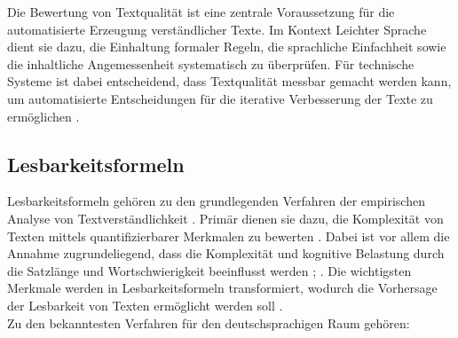 
Die Bewertung von Textqualität ist eine zentrale Voraussetzung für die automatisierte Erzeugung verständlicher Texte. 
Im Kontext Leichter Sprache dient sie dazu, die Einhaltung formaler Regeln, die sprachliche Einfachheit sowie die inhaltliche Angemessenheit systematisch zu überprüfen.
Für technische Systeme ist dabei entscheidend, dass Textqualität messbar gemacht werden kann, um automatisierte Entscheidungen für die iterative Verbesserung der Texte zu ermöglichen \cite[S. 85-90]{maas_handbuch_2018}.

\subsection{Lesbarkeitsformeln}
Lesbarkeitsformeln gehören zu den grundlegenden Verfahren der empirischen Analyse von Textverständlichkeit \cite[S. 123-124]{maas_handbuch_2018}.
Primär dienen sie dazu, die Komplexität von Texten mittels quantifizierbarer Merkmalen zu bewerten \cite[S. 123-124]{maas_handbuch_2018}.
Dabei ist vor allem die Annahme zugrundeliegend, dass die Komplexität und kognitive Belastung durch die Satzlänge und Wortschwierigkeit beeinflusst werden \cite[S. 149-150]{alva-manchego_data-driven_2020}; \cite[S. 123-124]{maas_handbuch_2018}.
Die wichtigsten Merkmale werden in Lesbarkeitsformeln transformiert, wodurch die Vorhersage der Lesbarkeit von Texten ermöglicht werden soll \cite[S. 123-124]{maas_handbuch_2018}.\\
Zu den bekanntesten Verfahren für den deutschsprachigen Raum gehören:
